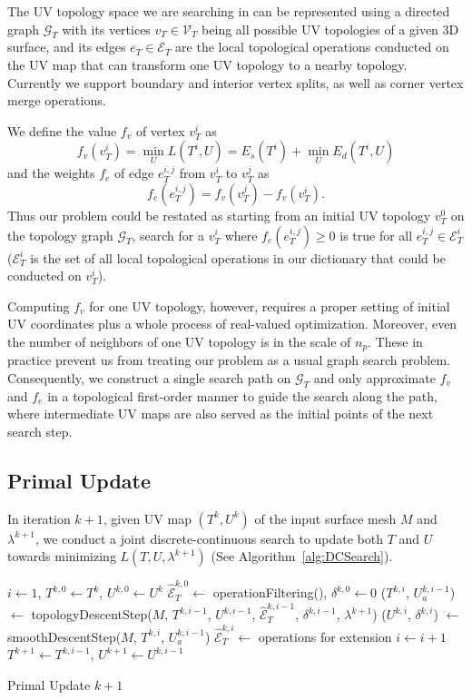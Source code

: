 The UV topology space we are searching in can be represented using a directed graph $\mathcal{G}_T$ with its vertices $v_T \in \mathcal{V}_T$ being all possible UV topologies of a given 3D surface, and its edges $e_T \in \mathcal{E}_T$ are the local topological operations conducted on the UV map that can transform one UV topology to a nearby topology. Currently we support boundary and interior vertex splits, as well as corner vertex merge operations.  

We define the value $f_v$ of vertex $v^i_T$ as 
\[ f_v(v^i_T) = \min_{U} L(T^i, U) = E_s(T^i) + \min_{U} E_d(T^i, U) \]
and the weights $f_e$ of edge $e^{i,j}_{T}$ from $v^i_T$ to $v^j_T$ as 
\[ f_e(e^{i,j}_T) = f_v(v^j_T) - f_v(v^i_T). \]
Thus our problem could be restated as starting from an initial UV topology $v^0_T$ on the topology graph $\mathcal{G}_T$, search for a $v^i_T$ where $f_e(e^{i,j}_T) \geq 0$ is true for all $e^{i,j}_T \in \mathcal{E}^i_T$ ($\mathcal{E}^i_T$ is the set of all local topological operations in our dictionary that could be conducted on $v^i_T$).

Computing $f_v$ for one UV topology, however, requires a proper setting of initial UV coordinates plus a whole process of real-valued optimization. Moreover, even the number of neighbors of one UV topology is in the scale of $n_p$. These in practice prevent us from treating our problem as a usual graph search problem. Consequently, we construct a single search path on $\mathcal{G}_T$ and only approximate $f_v$ and $f_e$ in a topological first-order manner to guide the search along the path, where intermediate UV maps are also served as the initial points of the next search step.

\subsection{Primal Update}
In iteration $k+1$, given UV map $(T^{k}, U^{k})$ of the input surface mesh $M$ and $\lambda^{k+1}$, we conduct a joint discrete-continuous search to update both $T$ and $U$ towards minimizing $L(T,U,\lambda^{k+1})$ (See Algorithm~\ref{alg:DCSearch}).

\begin{algorithm}[h]
\SetAlgoLined
{}
$i \leftarrow 1$, $T^{k,0} \leftarrow T^{k}$, $U^{k,0} \leftarrow U^{k}$\;
$\hat{\mathcal{E}}^{k,0}_T \leftarrow$ operationFiltering(), $\delta^{k,0} \leftarrow 0$\;
{
	($T^{k,i}$, $U_a^{k,i-1}$) $\leftarrow$ topologyDescentStep($M$, $T^{k,i-1}$, $U^{k,i-1}$, $\hat{\mathcal{E}}^{k,i-1}_T$, $\delta^{k,i-1}$, $\lambda^{k+1}$)\;
	($U^{k,i}$, $\delta^{k,i}$) $\leftarrow$ smoothDescentStep($M$, $T^{k,i}$, $U_a^{k,i-1}$)\;
	$\hat{\mathcal{E}}^{k,i}_T \leftarrow$ operations for extension\;
	$i \leftarrow i+1$\;
}
$T^{k+1} \leftarrow T^{k,i-1}$, $U^{k+1} \leftarrow U^{k,i-1}$
\caption{Primal Update $k+1$}
\label{alg:DCSearch}
\end{algorithm}

